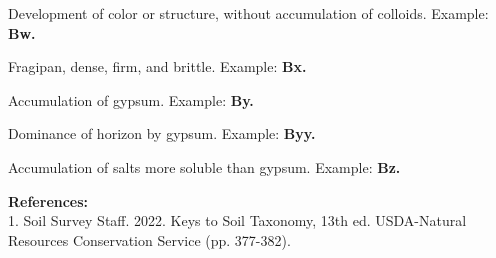 \documentclass[12pt]{exam}
\begin{document}
\begin{description}[labelsep=1.80em, align=right]
Development of color or structure, without accumulation of colloids. Example: \textbf{Bw.}
\vspace{0.1in}
\item[x] 
Fragipan, dense, firm, and brittle. Example: \textbf{Bx.}
\vspace{0.1in}
\item[y] 
Accumulation of gypsum. Example: \textbf{By.}
\vspace{0.1in}
\item[yy]
Dominance of horizon by gypsum. Example: \textbf{Byy.}
\vspace{0.1in}
\item[z] 
Accumulation of salts more soluble than gypsum. Example: \textbf{Bz.}
\vspace{0.2in}

\textbf{References:}\\
1. Soil Survey Staff. 2022. Keys to Soil Taxonomy, 13th ed. USDA-Natural Resources Conservation Service (pp. 377-382).
\end{description}
\end{document}
